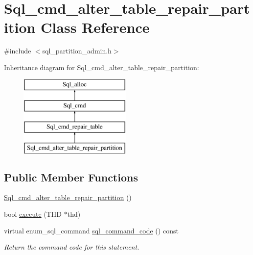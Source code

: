 \hypertarget{classSql__cmd__alter__table__repair__partition}{}\section{Sql\+\_\+cmd\+\_\+alter\+\_\+table\+\_\+repair\+\_\+partition Class Reference}
\label{classSql__cmd__alter__table__repair__partition}


{\ttfamily \#include $<$sql\+\_\+partition\+\_\+admin.\+h$>$}

Inheritance diagram for Sql\+\_\+cmd\+\_\+alter\+\_\+table\+\_\+repair\+\_\+partition\+:\begin{figure}[H]
\begin{center}
\leavevmode
\includegraphics[height=4.000000cm]{classSql__cmd__alter__table__repair__partition}
\end{center}
\end{figure}
\subsection*{Public Member Functions}
\begin{DoxyCompactItemize}
\item 
\mbox{\hyperlink{classSql__cmd__alter__table__repair__partition_ae936846b5f6f8ab43bd34438a24dcd74}{Sql\+\_\+cmd\+\_\+alter\+\_\+table\+\_\+repair\+\_\+partition}} ()
\item 
bool \mbox{\hyperlink{classSql__cmd__alter__table__repair__partition_a48d4d8c83b4d7c15b0f6232eae9dfe5a}{execute}} (T\+HD $\ast$thd)
\item 
\mbox{\label{classSql__cmd__alter__table__repair__partition_a992af05adbed0369fbd2ea16e8f08782}} 
virtual enum\+\_\+sql\+\_\+command \mbox{\hyperlink{classSql__cmd__alter__table__repair__partition_a992af05adbed0369fbd2ea16e8f08782}{sql\+\_\+command\+\_\+code}} () const
\begin{DoxyCompactList}\small\item\em Return the command code for this statement. \end{DoxyCompactList}\end{DoxyCompactItemize}
